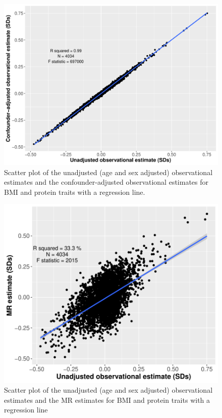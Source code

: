 \documentclass[11pt,twoside]{bristolthesis}
\begin{document}
\begin{figure}
\includegraphics[width=1\linewidth,height=0.65\textheight]{figure/BMI_protein_INTERVAL/obs_v_obs_adj_scatter} \caption[Scatter plot comparing the unadjusted and confounder-adjusted observational BMI-protein estimates]{Scatter plot of the unadjusted (age and sex adjusted) observational estimates and the confounder-adjusted observational estimates for BMI and protein traits with a regression line.}\label{fig:Estimate-comparison-obs}
\end{figure}
\begin{figure}
\includegraphics{figure/BMI_protein_INTERVAL/unadj_obs_MR_scatter_small} \caption[Scatter plot comparing the observational and MR BMI-protein estimates]{Scatter plot of the unadjusted (age and sex adjusted) observational estimates and the MR estimates for BMI and protein traits with a regression line}\label{fig:Estimate-comparison-obs-mr}
\end{figure}
\end{document}
